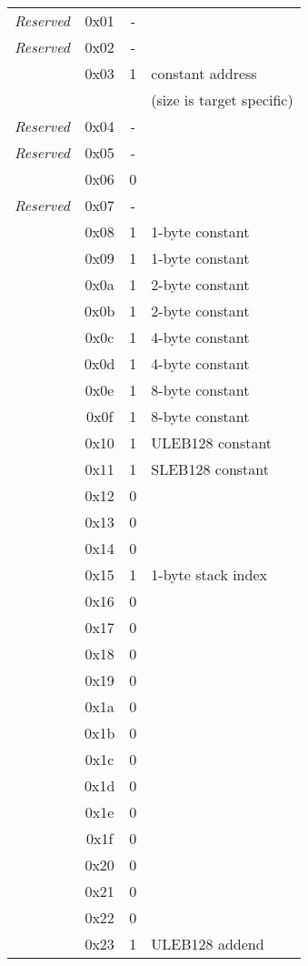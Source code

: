 \begin{centering}
\begin{longtable}{l|c|c|l}
\textit{Reserved}	&0x01&-& \\
\textit{Reserved}	&0x02&-& \\
\DWOPaddr			&0x03&1 & constant address  \\ 
					& & &(size is target specific) \\
\textit{Reserved}	&0x04&-& \\
\textit{Reserved}	&0x05&-& \\
\DWOPderef			&0x06&0 & \\
\textit{Reserved}	&0x07&-& \\
\DWOPconstoneu		&0x08&1&1-byte constant  \\
\DWOPconstones		&0x09&1&1-byte constant   \\
\DWOPconsttwou		&0x0a&1&2-byte constant   \\
\DWOPconsttwos		&0x0b&1&2-byte constant   \\
\DWOPconstfouru		&0x0c&1&4-byte constant    \\
\DWOPconstfours		&0x0d&1&4-byte constant   \\
\DWOPconsteightu	&0x0e&1&8-byte constant   \\
\DWOPconsteights	&0x0f&1&8-byte constant   \\
\DWOPconstu			&0x10&1&ULEB128 constant   \\
\DWOPconsts			&0x11&1&SLEB128 constant   \\
\DWOPdup			&0x12&0 &   \\
\DWOPdrop			&0x13&0 &   \\
\DWOPover			&0x14&0 &   \\
\DWOPpick			&0x15&1&1-byte stack index   \\
\DWOPswap			&0x16&0 &   \\
\DWOProt			&0x17&0 &   \\
\DWOPxderef			&0x18&0 &   \\
\DWOPabs			&0x19&0 &   \\
\DWOPand			&0x1a&0 &   \\
\DWOPdiv			&0x1b&0 &   \\
\DWOPminus			&0x1c&0 & \\
\DWOPmod			&0x1d&0 & \\
\DWOPmul			&0x1e&0 & \\
\DWOPneg			&0x1f&0 & \\
\DWOPnot			&0x20&0 & \\
\DWOPor				&0x21&0 & \\
\DWOPplus			&0x22&0 & \\
\DWOPplusuconst		&0x23&1&ULEB128 addend \\

\end{longtable}
\end{centering}
